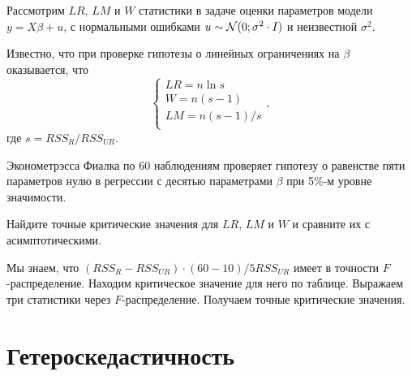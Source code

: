 \begin{problem}
Рассмотрим $LR$, $LM$ и $W$ статистики в задаче оценки параметров модели $y=X\beta + u$, с нормальными ошибками $u\sim \mathcal{N}(0;\sigma^2 \cdot I)$ и неизвестной $\sigma^2$.

Известно, что при проверке гипотезы о линейных ограничениях на $\beta$ оказывается, что
\[
\begin{cases}
   LR = n \ln s \\
   W = n (s - 1) \\
   LM = n(s-1)/s \\
\end{cases},
\]
где $s = RSS_R / RSS_{UR}$.

Эконометрэсса Фиалка по 60 наблюдениям проверяет гипотезу о равенстве пяти параметров нулю
в регрессии с десятью параметрами $\beta$ при 5\%-м уровне значимости.

Найдите точные критические значения для $LR$, $LM$ и $W$ и сравните их с асимптотическими.

  \begin{sol}
      Мы знаем, что $(RSS_R - RSS_{UR}) \cdot (60 - 10) / 5 RSS_{UR}$ имеет в точности $F$-распределение.
      Находим критическое значение для него по таблице. Выражаем три статистики через $F$-распределение.
      Получаем точные критические значения.
  \end{sol}
\end{problem}







\section{Гетероскедастичность}


